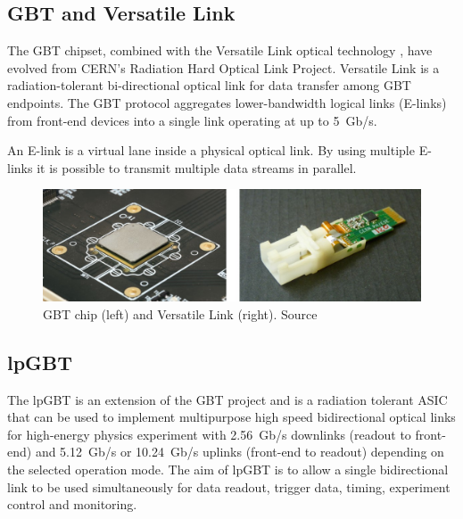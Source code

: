 \subsection{\acl{GBT} and Versatile Link}
\label{subsec:felix-gbt}

The \ac{GBT} chipset, combined with the Versatile Link optical technology \cite{gbt-versatile-link}, have evolved from \ac{CERN}'s Radiation Hard Optical Link Project. Versatile Link is a radiation-tolerant bi-directional optical link for data transfer among \acs{GBT} endpoints. The \ac{GBT} protocol aggregates lower-bandwidth logical links (\acs{E-link}s) from front-end devices into a single link operating at up to 5~Gb/s.

\begin{definition}
\label{def:elink}
An \acs{E-link} is a virtual lane inside a physical optical link. By using multiple \acs{E-link}s it is possible to transmit multiple data streams in parallel.
\end{definition}

\begin{figure}[H]
\centering
\includegraphics[width=\textwidth]{images/felix/gbt.jpg}
\caption[GBT and Versatile Link]{\acs{GBT} chip (left) and Versatile Link (right). Source \protect\cite{gbt-versatile-link}}
\label{fig:gbt-versalink-combined}
\end{figure}

\subsection{\acf{lpGBT}}
\label{subsec:felix-lpgbt}

The \acf{lpGBT} \cite{lpgbt} is an extension of the \acf{GBT} project and is a radiation tolerant \acs{ASIC} that can be used to implement multipurpose high speed bidirectional optical links for high-energy physics experiment with 2.56~Gb/s downlinks (readout to front-end) and 5.12~Gb/s or 10.24~Gb/s uplinks (front-end to readout) depending on the selected operation mode. The aim of \acs{lpGBT} is to allow a single bidirectional link to be used simultaneously for data readout, trigger data, timing, experiment control and monitoring.

